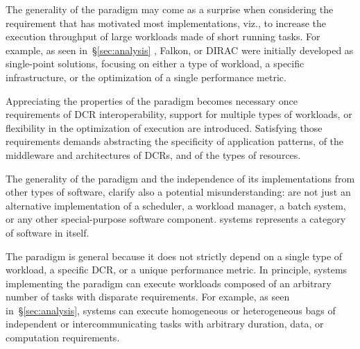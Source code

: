 \documentclass{sig-alternate}
\begin{document}

The generality of the \pilot paradigm may come as a surprise when considering
the requirement that has motivated most implementations, viz., to increase the
execution throughput of large workloads made of short running tasks. For
example, as seen in~\S\ref{sec:analysis} \panda, Falkon, or DIRAC were initially
developed as single-point solutions, focusing on either a type of workload, a
specific infrastructure, or the optimization of a single performance metric.

Appreciating the properties of the \pilot paradigm becomes necessary once
requirements of DCR interoperability, support for multiple types of workloads,
or flexibility in the optimization of execution are introduced. Satisfying those
requirements demands abstracting the specificity of application patterns, of the
middleware and architectures of DCRs, and of the types of resources.


The generality of the \pilot paradigm and the independence of its
implementations from other types of software, clarify also a potential
misunderstanding: \pilots are not just an alternative implementation of a
scheduler, a workload manager, a batch system, or any other special-purpose
software component. \pilot systems represents a category of software in itself.



The \pilot paradigm is general because it does not strictly depend on a single
type of workload, a specific DCR, or a unique performance metric. In principle,
systems implementing the \pilot paradigm can execute workloads composed of an
arbitrary number of tasks with disparate requirements. For example, as seen
in~\S\ref{sec:analysis}, \pilot systems can execute homogeneous or heterogeneous
bags of independent or intercommunicating tasks with arbitrary duration, data,
or computation requirements.
\end{document}
